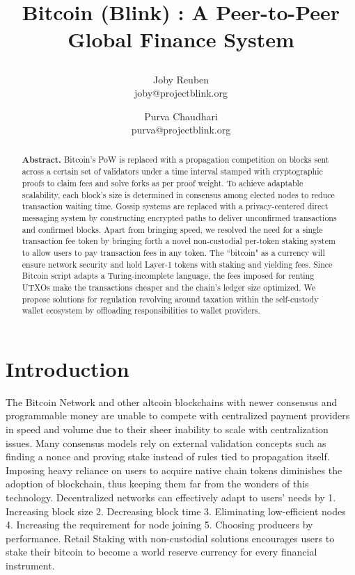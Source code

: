 \documentclass[a4paper,	10pt]{extarticle}
\title{
 \large \textbf{Bitcoin (Blink) : A Peer-to-Peer Global Finance System}
\author{ \myfontt Joby Reuben \\ \myfontt joby@projectblink.org \and  \myfontt Purva Chaudhari \\ \myfontt purva@projectblink.org}}
\date{}
\begin{document}
\maketitle
\begin{abstract}
\noindent \textbf{Abstract.} Bitcoin's PoW is replaced with a propagation competition on blocks sent across a certain set of validators under a time interval stamped with cryptographic proofs to claim fees and solve forks as per proof weight. To achieve adaptable scalability, each block's size is determined in consensus among elected nodes to reduce transaction waiting time. Gossip systems are replaced with a privacy-centered direct messaging system by constructing encrypted paths to deliver unconfirmed transactions and confirmed blocks. Apart from bringing speed, we resolved the need for a single transaction fee token by bringing forth a novel non-custodial per-token staking system to allow users to pay transaction fees in any token. The ``bitcoin" as a currency will ensure network security and hold Layer-1 tokens with staking and yielding fees. Since Bitcoin script adapts a Turing-incomplete language, the fees imposed for renting UTXOs make the transactions cheaper and the chain's ledger size optimized. We propose solutions for regulation revolving around taxation within the self-custody wallet ecosystem by offloading responsibilities to wallet providers. 
\end{abstract}
\section{Introduction}
The Bitcoin Network \cite{nakamoto2008bitcoin} and other altcoin blockchains with newer consensus and programmable money are unable to compete with centralized payment providers in speed and volume due to their sheer inability to scale with centralization issues. Many consensus models rely on external validation concepts such as finding a nonce and proving stake instead of rules tied to propagation itself. Imposing heavy reliance on users to acquire native chain tokens diminishes the adoption of blockchain, thus keeping them far from the wonders of this technology. Decentralized networks can effectively adapt to users’ needs by 1. Increasing block size 2. Decreasing block time 3. Eliminating low-efficient nodes 4. Increasing the requirement for node joining 5. Choosing producers by performance. Retail Staking with non-custodial solutions encourages users to stake their bitcoin to become a world reserve currency for every financial instrument.
\end{document}
